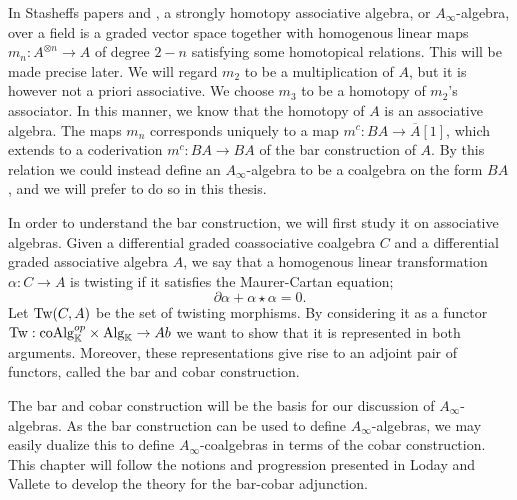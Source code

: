 \documentclass[../thesis.tex]{subfiles}
\begin{document}
        In Stasheffs papers \cite{Stasheff63I} and \cite{Stasheff63II}, a strongly homotopy associative algebra, or $A_\infty$-algebra, over a field is a graded vector space together with homogenous linear maps $m_n:A^{\otimes n}\rightarrow A$ of degree $2-n$ satisfying some homotopical relations. This will be made precise later. We will regard $m_2$ to be a multiplication of $A$, but it is however not a priori associative. We choose $m_3$ to be a homotopy of $m_2$'s associator. In this manner, we know that the homotopy of $A$ is an associative algebra. The maps $m_n$ corresponds uniquely to a map $m^c:BA\rightarrow \overline{A}[1]$, which extends to a coderivation $m^c : BA\rightarrow BA$ of the bar construction of $A$. By this relation we could instead define an $A_\infty$-algebra to be a coalgebra on the form $BA$, and we will prefer to do so in this thesis.


        In order to understand the bar construction, we will first study it on associative algebras. Given a differential graded coassociative coalgebra $C$ and a differential graded associative algebra $A$, we say that a homogenous linear transformation $\alpha: C\rightarrow A$ is twisting if it satisfies the Maurer-Cartan equation;
            \begin{equation*}
                \partial\alpha + \alpha\star\alpha = 0.
            \end{equation*}
        Let $\tt{Tw}(C,A)$ be the set of twisting morphisms. By considering it as a functor $\tt{Tw} : \tt{coAlg}_{\mathbb{K}}^{op}\times \tt{Alg}_{\mathbb{K}} \rightarrow Ab$ we want to show that it is represented in both arguments. Moreover, these representations give rise to an adjoint pair of functors, called the bar and cobar construction.

        \begin{center}
        \end{center}

        The bar and cobar construction will be the basis for our discussion of $A_\infty$-algebras. As the bar construction can be used to define $A_\infty$-algebras, we may easily dualize this to define $A_\infty$-coalgebras in terms of the cobar construction. This chapter will follow the notions and progression presented in Loday and Vallete \cite{Loday12} to develop the theory for the bar-cobar adjunction.
\end{document}
